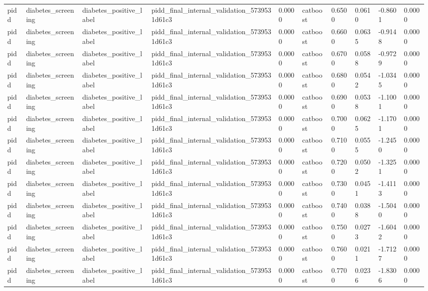 \begin{tabular}{llllllllll}
pidd & diabetes\_screening & diabetes\_positive\_label & pidd\_final\_internal\_validation\_5739531d61c3 & 0.0000 & catboost & 0.6500 & 0.0610 & -0.8601 & 0.0000 \\
pidd & diabetes\_screening & diabetes\_positive\_label & pidd\_final\_internal\_validation\_5739531d61c3 & 0.0000 & catboost & 0.6600 & 0.0635 & -0.9148 & 0.0000 \\
pidd & diabetes\_screening & diabetes\_positive\_label & pidd\_final\_internal\_validation\_5739531d61c3 & 0.0000 & catboost & 0.6700 & 0.0588 & -0.9729 & 0.0000 \\
pidd & diabetes\_screening & diabetes\_positive\_label & pidd\_final\_internal\_validation\_5739531d61c3 & 0.0000 & catboost & 0.6800 & 0.0542 & -1.0345 & 0.0000 \\
pidd & diabetes\_screening & diabetes\_positive\_label & pidd\_final\_internal\_validation\_5739531d61c3 & 0.0000 & catboost & 0.6900 & 0.0538 & -1.1001 & 0.0000 \\
pidd & diabetes\_screening & diabetes\_positive\_label & pidd\_final\_internal\_validation\_5739531d61c3 & 0.0000 & catboost & 0.7000 & 0.0625 & -1.1701 & 0.0000 \\
pidd & diabetes\_screening & diabetes\_positive\_label & pidd\_final\_internal\_validation\_5739531d61c3 & 0.0000 & catboost & 0.7100 & 0.0555 & -1.2450 & 0.0000 \\
pidd & diabetes\_screening & diabetes\_positive\_label & pidd\_final\_internal\_validation\_5739531d61c3 & 0.0000 & catboost & 0.7200 & 0.0502 & -1.3251 & 0.0000 \\
pidd & diabetes\_screening & diabetes\_positive\_label & pidd\_final\_internal\_validation\_5739531d61c3 & 0.0000 & catboost & 0.7300 & 0.0451 & -1.4113 & 0.0000 \\
pidd & diabetes\_screening & diabetes\_positive\_label & pidd\_final\_internal\_validation\_5739531d61c3 & 0.0000 & catboost & 0.7400 & 0.0388 & -1.5040 & 0.0000 \\
pidd & diabetes\_screening & diabetes\_positive\_label & pidd\_final\_internal\_validation\_5739531d61c3 & 0.0000 & catboost & 0.7500 & 0.0273 & -1.6042 & 0.0000 \\
pidd & diabetes\_screening & diabetes\_positive\_label & pidd\_final\_internal\_validation\_5739531d61c3 & 0.0000 & catboost & 0.7600 & 0.0211 & -1.7127 & 0.0000 \\
pidd & diabetes\_screening & diabetes\_positive\_label & pidd\_final\_internal\_validation\_5739531d61c3 & 0.0000 & catboost & 0.7700 & 0.0236 & -1.8306 & 0.0000 \\

\end{tabular}
